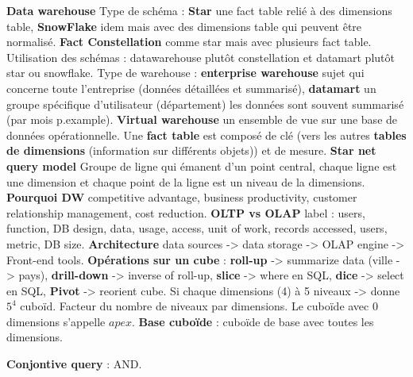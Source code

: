 \documentclass[9pt,a4paper]{report}
\begin{document}
\textbf{Data warehouse} Type de schéma : \textbf{Star} une fact table relié à des dimensions table, \textbf{SnowFlake} idem mais avec des dimensions table qui peuvent être normalisé. \textbf{ Fact Constellation} comme star mais avec plusieurs fact table. Utilisation des schémas : datawarehouse plutôt constellation et datamart plutôt star ou snowflake. Type de warehouse : \textbf{enterprise warehouse} sujet qui concerne toute l'entreprise (données détaillées et summarisé), \textbf{datamart} un groupe spécifique d'utilisateur (département) les données sont souvent summarisé (par mois p.example). \textbf{Virtual warehouse} un ensemble de vue sur une base de données opérationnelle. Une \textbf{fact table} est composé de clé (vers les autres \textbf{tables de dimensions} (information sur différents objets)) et de mesure. \textbf{Star net query model} Groupe de ligne qui émanent d'un point central, chaque ligne est une dimension et chaque point de la ligne est un niveau de la dimensions. \textbf{Pourquoi DW} competitive advantage, business productivity, customer relationship management, cost reduction. \textbf{OLTP vs OLAP} label : users, function, DB design, data, usage, access, unit of work, records accessed, users, metric, DB size. \textbf{Architecture} data sources -> data storage -> OLAP engine -> Front-end tools. \textbf{Opérations sur un cube} : \textbf{roll-up} -> summarize data (ville -> pays), \textbf{drill-down} -> inverse of roll-up, \textbf{slice} -> where en SQL, \textbf{dice} -> select en SQL, \textbf{Pivot} -> reorient cube. Si chaque dimensions (4) à 5 niveaux -> donne $5^4$ cuboïd. Facteur du nombre de niveaux par dimensions. Le cuboïde avec $0$ dimensions s'appelle $apex$. \textbf{Base cuboïde} : cuboïde de base avec toutes les dimensions.

\newpage
\textbf{Conjontive query} : AND.
\end{document}
